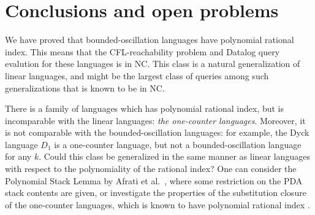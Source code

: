 \documentclass[11pt,a4paper]{article} %
\begin{document}
\section{Conclusions and open problems}
\label{sec:conc}

We have proved that bounded-oscillation languages
have polynomial rational index.
This means that the CFL-reachability problem and Datalog query evalution for these languages is in NC.
This class is a natural generalization of linear languages,
and might be the largest class of queries among such generalizations
that is known to be in NC.


There is a family of languages which has polynomial rational index,
but is incomparable with the linear languages:
\emph{the one-counter languages}.
Moreover, it is not comparable with the bounded-oscillation languages:
for example, the Dyck language $D_1$ is a one-counter language,
but not a bounded-oscillation language for any $k$.
Could this class be generalized in the same manner as linear languages
with respect to the polynomiality of the rational index?
One can consider the Polynomial Stack Lemma by Afrati et al.~\cite{ChainQ},
where some restriction on the PDA stack contents are given,
or investigate the properties of the substitution closure of the one-counter languages,
which is known to have polynomial rational index \cite{RatBasic}. 




\begin{comment}
\section*{Acknowledgments}
This research was supported by the Russian Science Foundation, grant \textnumero 18-11-00100.
\end{comment}




\end{document}
